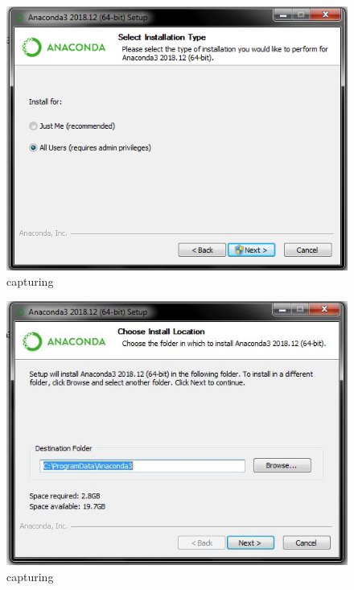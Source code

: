\begin{enumerate}
\begin{itemize}
\begin{figure}[ht]
\centering
\includegraphics[scale=0.5]{figures/3.png}
\caption{capturing}
\label{proses instalasi}
\end{figure}

\begin{figure}[ht]
\centering
\includegraphics[scale=0.5]{figures/4.jpg}
\caption{capturing}
\label{proses instalasi}
\end{figure}


\end{itemize}
\end{enumerate}
